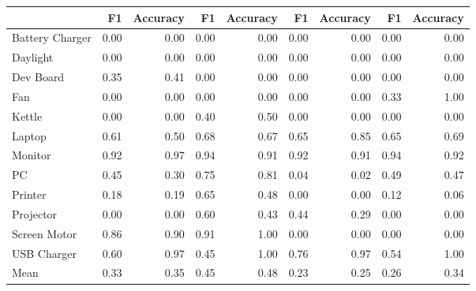 \begin{tabular}{lrrrrrrrr}
\toprule
{} &    F1 &  Accuracy &    F1 &  Accuracy &    F1 &  Accuracy &    F1 &  Accuracy \\
\midrule
Battery Charger &  0.00 &      0.00 &  0.00 &      0.00 &  0.00 &      0.00 &  0.00 &      0.00 \\
Daylight        &  0.00 &      0.00 &  0.00 &      0.00 &  0.00 &      0.00 &  0.00 &      0.00 \\
Dev Board       &  0.35 &      0.41 &  0.00 &      0.00 &  0.00 &      0.00 &  0.00 &      0.00 \\
Fan             &  0.00 &      0.00 &  0.00 &      0.00 &  0.00 &      0.00 &  0.33 &      1.00 \\
Kettle          &  0.00 &      0.00 &  0.40 &      0.50 &  0.00 &      0.00 &  0.00 &      0.00 \\
Laptop          &  0.61 &      0.50 &  0.68 &      0.67 &  0.65 &      0.85 &  0.65 &      0.69 \\
Monitor         &  0.92 &      0.97 &  0.94 &      0.91 &  0.92 &      0.91 &  0.94 &      0.92 \\
PC              &  0.45 &      0.30 &  0.75 &      0.81 &  0.04 &      0.02 &  0.49 &      0.47 \\
Printer         &  0.18 &      0.19 &  0.65 &      0.48 &  0.00 &      0.00 &  0.12 &      0.06 \\
Projector       &  0.00 &      0.00 &  0.60 &      0.43 &  0.44 &      0.29 &  0.00 &      0.00 \\
Screen Motor    &  0.86 &      0.90 &  0.91 &      1.00 &  0.00 &      0.00 &  0.00 &      0.00 \\
USB Charger     &  0.60 &      0.97 &  0.45 &      1.00 &  0.76 &      0.97 &  0.54 &      1.00 \\
Mean            &  0.33 &      0.35 &  0.45 &      0.48 &  0.23 &      0.25 &  0.26 &      0.34 \\
\bottomrule
\end{tabular}
